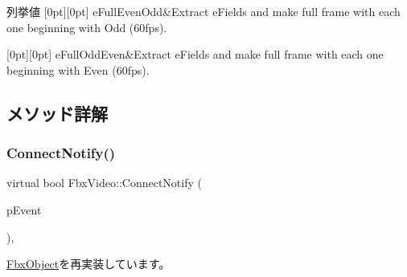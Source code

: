 \begin{DoxyEnumFields}{列挙値}
[0pt][0pt]{}\mbox{\label{class_fbx_video_a1e60229c28a15e29289f3f00b23aa215a5643f7d85ee0d023d43b0d0feb11ea73}} 
e\+Full\+Even\+Odd&Extract e\+Fields and make full frame with each one beginning with Odd (60fps). \\
\hline

[0pt][0pt]{}\mbox{\label{class_fbx_video_a1e60229c28a15e29289f3f00b23aa215aa342e3401c45173cdfd733920163340f}} 
e\+Full\+Odd\+Even&Extract e\+Fields and make full frame with each one beginning with Even (60fps). \\
\hline

\end{DoxyEnumFields}


\subsection{メソッド詳解}
\mbox{\label{class_fbx_video_afb1d8565917f33ab3777ac9e07b21cd0}} 
\subsubsection{\texorpdfstring{Connect\+Notify()}{ConnectNotify()}}
{\footnotesize\ttfamily virtual bool Fbx\+Video\+::\+Connect\+Notify (\begin{DoxyParamCaption}\item[{\hyperlink{class_fbx_connect_event}{Fbx\+Connect\+Event} const \&}]{p\+Event }\end{DoxyParamCaption})\hspace{0.3cm}{\ttfamily [protected]}, {\ttfamily [virtual]}}



\hyperlink{class_fbx_object_ab7a400f3829d1f0da57d3d78c8168dd0}{Fbx\+Object}を再実装しています。

\mbox{\label{class_fbx_video_a1cd66b3d19e213f62f90d073462e4cce}} 
